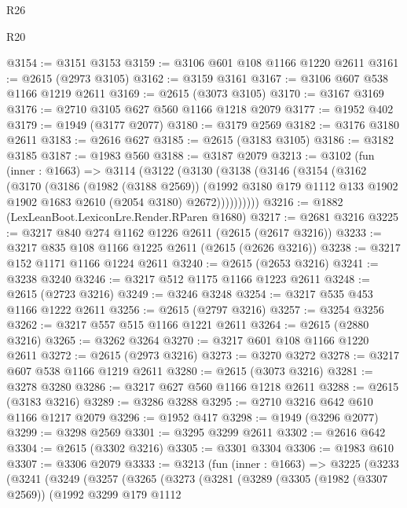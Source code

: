 \begin{lexlean}{R26}
\begin{lexlean}{R20}
\begin{coremodule}
{{{{{{{{{{{{{{{{{{{{{{{{{{{{{{{{{{{{{{{{{{{{{{{{{{{{{{{{{{{{{{{@3154 := @3151 @3153
@3159 := @3106 @601 @108 @1166 @1220 @2611
@3161 := @2615 (@2973 @3105)
@3162 := @3159 @3161
@3167 := @3106 @607 @538 @1166 @1219 @2611
@3169 := @2615 (@3073 @3105)
@3170 := @3167 @3169
@3176 := @2710 @3105 @627 @560 @1166 @1218 @2079
@3177 := @1952 @402
@3179 := @1949 (@3177 @2077)
@3180 := @3179 @2569
@3182 := @3176 @3180 @2611
@3183 := @2616 @627
@3185 := @2615 (@3183 @3105)
@3186 := @3182 @3185
@3187 := @1983 @560
@3188 := @3187 @2079
@3213 := @3102
    (fun (inner : @1663) =>
    @3114
      (@3122
        (@3130
          (@3138
            (@3146
              (@3154
                (@3162
                  (@3170
                    (@3186
                      (@1982 (@3188 @2569))
                      (@1992
                        @3180
                        @179
                        @1112
                        @133
                        @1902
                        @1902
                        @1683
                        @2610
                        (@2054 @3180)
                        @2672))))))))))
@3216 := @1882 (LexLeanBoot.LexiconLre.Render.RParen @1680)
@3217 := @2681 @3216
@3225 := @3217 @840 @274 @1162 @1226 @2611 (@2615 (@2617 @3216))
@3233 := @3217 @835 @108 @1166 @1225 @2611 (@2615 (@2626 @3216))
@3238 := @3217 @152 @1171 @1166 @1224 @2611
@3240 := @2615 (@2653 @3216)
@3241 := @3238 @3240
@3246 := @3217 @512 @1175 @1166 @1223 @2611
@3248 := @2615 (@2723 @3216)
@3249 := @3246 @3248
@3254 := @3217 @535 @453 @1166 @1222 @2611
@3256 := @2615 (@2797 @3216)
@3257 := @3254 @3256
@3262 := @3217 @557 @515 @1166 @1221 @2611
@3264 := @2615 (@2880 @3216)
@3265 := @3262 @3264
@3270 := @3217 @601 @108 @1166 @1220 @2611
@3272 := @2615 (@2973 @3216)
@3273 := @3270 @3272
@3278 := @3217 @607 @538 @1166 @1219 @2611
@3280 := @2615 (@3073 @3216)
@3281 := @3278 @3280
@3286 := @3217 @627 @560 @1166 @1218 @2611
@3288 := @2615 (@3183 @3216)
@3289 := @3286 @3288
@3295 := @2710 @3216 @642 @610 @1166 @1217 @2079
@3296 := @1952 @417
@3298 := @1949 (@3296 @2077)
@3299 := @3298 @2569
@3301 := @3295 @3299 @2611
@3302 := @2616 @642
@3304 := @2615 (@3302 @3216)
@3305 := @3301 @3304
@3306 := @1983 @610
@3307 := @3306 @2079
@3333 := @3213
    (fun (inner : @1663) =>
    @3225
      (@3233
        (@3241
          (@3249
            (@3257
              (@3265
                (@3273
                  (@3281
                    (@3289
                      (@3305
                        (@1982 (@3307 @2569))
                        (@1992
                          @3299
                          @179
                          @1112
}}}}}}}}}}}}}}}}}}}}}}}}}}}}}}}}}}}}}}}}}}}}}}}}}}}}}}}}}}}}}}}
\end{coremodule}
\end{lexlean}
\end{lexlean}
